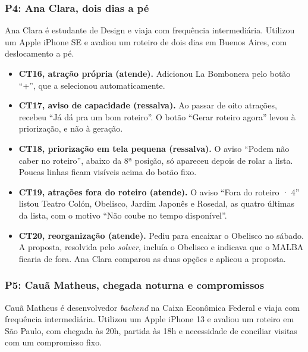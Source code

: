 \subsubsection{P4: Ana Clara, dois dias a pé}

Ana Clara é estudante de Design e viaja com frequência intermediária. Utilizou um Apple iPhone SE e avaliou um roteiro de dois dias em Buenos Aires, com deslocamento a pé.

\begin{itemize}
  \item \textbf{CT16, atração própria (atende).} Adicionou La Bombonera pelo botão ``+'', que a selecionou automaticamente.
  \item \textbf{CT17, aviso de capacidade (ressalva).} Ao passar de oito atrações, recebeu ``Já dá pra um bom roteiro''. O botão ``Gerar roteiro agora'' levou à priorização, e não à geração.
  \item \textbf{CT18, priorização em tela pequena (ressalva).} O aviso ``Podem não caber no roteiro'', abaixo da 8ª posição, só apareceu depois de rolar a lista. Poucas linhas ficam visíveis acima do botão fixo.
  \item \textbf{CT19, atrações fora do roteiro (atende).} O aviso ``Fora do roteiro · 4'' listou Teatro Colón, Obelisco, Jardim Japonês e Rosedal, as quatro últimas da lista, com o motivo ``Não coube no tempo disponível''.
  \item \textbf{CT20, reorganização (atende).} Pediu para encaixar o Obelisco no sábado. A proposta, resolvida pelo \textit{solver}, incluía o Obelisco e indicava que o MALBA ficaria de fora. Ana Clara comparou as duas opções e aplicou a proposta.
\end{itemize}

\subsubsection{P5: Cauã Matheus, chegada noturna e compromissos}

Cauã Matheus é desenvolvedor \textit{backend} na Caixa Econômica Federal e viaja com frequência intermediária. Utilizou um Apple iPhone 13 e avaliou um roteiro em São Paulo, com chegada às 20h, partida às 18h e necessidade de conciliar visitas com um compromisso fixo.


